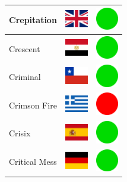 \documentclass[12pt, a4paper, twoside]{report}
\begin{document}
\begin{center}
\begin{longtable}{|p{5cm}|p{2cm}|p{2cm}|}
 Crepitation                                                & \includegraphics[width=1cm]{../4x3/gb} &   \includegraphics[width=1cm]{../likes/y} \\ \hline
 Crescent                                                   & \includegraphics[width=1cm]{../4x3/eg} &   \includegraphics[width=1cm]{../likes/y} \\ \hline
 Criminal                                                   & \includegraphics[width=1cm]{../4x3/cl} &   \includegraphics[width=1cm]{../likes/y} \\ \hline
 Crimson Fire                                               & \includegraphics[width=1cm]{../4x3/gr} &   \includegraphics[width=1cm]{../likes/n} \\ \hline
 Crisix                                                     & \includegraphics[width=1cm]{../4x3/es} &   \includegraphics[width=1cm]{../likes/y} \\ \hline
 Critical Mess                                              & \includegraphics[width=1cm]{../4x3/de} &   \includegraphics[width=1cm]{../likes/y} \\ \hline

\end{longtable}
\end{center}
\end{document}
